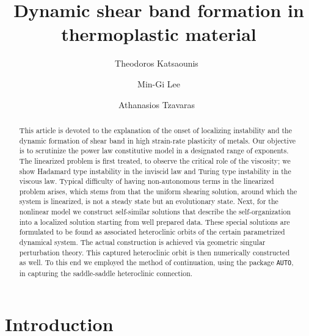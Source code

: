 \documentclass[a4paper,11pt]{article}
\theoremstyle{remark}
\begin{document}
\title{Dynamic shear band formation in thermoplastic material}
\author{Theodoros Katsaounis\footnotemark[1]\ \footnotemark[2]
\and Min-Gi Lee\footnotemark[1]
\and Athanasios Tzavaras\footnotemark[1]\  \footnotemark[2]  \footnotemark[3]}
\date{}

\maketitle
\renewcommand{\thefootnote}{\fnsymbol{footnote}}
\renewcommand{\thefootnote}{\arabic{footnote}}
\begin{abstract}


This article is devoted to the explanation of the onset of localizing instability and the dynamic formation of shear band in high strain-rate plasticity of metals. Our objective is to scrutinize the power law constitutive model in a designated range of exponents. The linearized problem is first treated, to observe the critical role of the viscosity; we show Hadamard type instability in the inviscid law and Turing type instability in the viscous law. Typical difficulty of having non-autonomous terms in the linearized problem arises, which stems from that the uniform shearing solution, around which the system is linearized, is not a steady state but an evolutionary state. Next, for the nonlinear model we construct self-similar solutions that describe
the self-organization into a localized solution starting from well prepared data. These special solutions are formulated to be found as associated heteroclinic orbits of the certain parametrized dynamical system. The actual construction is achieved via geometric singular perturbation theory. This captured heteroclinic orbit is then numerically constructed as well. To this end we employed the method of continuation, using the package \texttt{AUTO}, in capturing the saddle-saddle heteroclinic connection. 
\end{abstract}

\section{Introduction}
\end{document}
